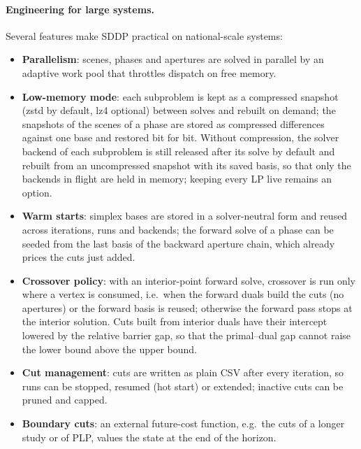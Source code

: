 \paragraph{Engineering for large systems.}
Several features make SDDP practical on national-scale systems:
\begin{itemize}
  \item \textbf{Parallelism}: scenes, phases and apertures are solved in
    parallel by an adaptive work pool that throttles dispatch on free
    memory.
  \item \textbf{Low-memory mode}: each subproblem is kept as a
    compressed snapshot (zstd by default, lz4 optional) between solves
    and rebuilt on demand; the snapshots of the scenes of a phase are
    stored as compressed differences against one base and restored bit
    for bit.  Without compression, the solver backend of each
    subproblem is still released after its solve by default and rebuilt
    from an uncompressed snapshot with its saved basis, so that only the
    backends in flight are held in memory; keeping every LP live
    remains an option.
  \item \textbf{Warm starts}: simplex bases are stored in a
    solver-neutral form and reused across iterations, runs and
    backends; the forward solve of a phase can be seeded from the last
    basis of the backward aperture chain, which already prices the cuts
    just added.
  \item \textbf{Crossover policy}: with an interior-point forward
    solve, crossover is run only where a vertex is consumed, i.e.\ when
    the forward duals build the cuts (no apertures) or the forward
    basis is reused; otherwise the forward pass stops at the interior
    solution.  Cuts built from interior duals have their intercept
    lowered by the relative barrier gap, so that the primal--dual gap
    cannot raise the lower bound above the upper bound.
  \item \textbf{Cut management}: cuts are written as plain CSV after
    every iteration, so runs can be stopped, resumed (hot start) or
    extended; inactive cuts can be pruned and capped.
  \item \textbf{Boundary cuts}: an external future-cost function,
    e.g.\ the cuts of a longer study or of PLP, values the state at the
    end of the horizon.
\end{itemize}

